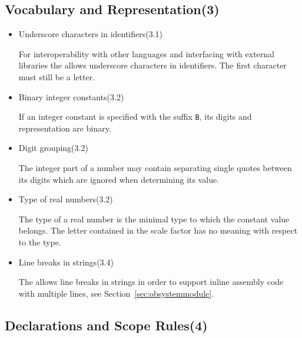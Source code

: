 \newcommand{\obref}[1]{\alignright(#1)\nopagebreak}
\newcommand{\obsection}[2]{\subsection[#1]{#1\alignright(#2)}}

\obsection{Vocabulary and Representation}{3}

\begin{itemize}

\item Underscore characters in identifiers\obref{3.1}

For interoperability with other languages and interfacing with external libraries the \ecs{} allows underscore characters in identifiers.
The first character must still be a letter.

\item Binary integer constants\obref{3.2}

If an integer constant is specified with the suffix \texttt{B}, its digits and representation are binary.

\item Digit grouping\obref{3.2}

The integer part of a number may contain separating single quotes between its digits which are ignored when determining its value.

\item Type of real numbers\obref{3.2}

The type of a real number is the minimal type to which the constant value belongs.
The letter contained in the scale factor has no meaning with respect to the type.

\item Line breaks in strings\obref{3.4}

The \ecs{} allows line breaks in strings in order to support inline assembly code with multiple lines, see Section~\ref{sec:obsystemmodule}.

\end{itemize}

\obsection{Declarations and Scope Rules}{4}\label{sec:obdeclarations}


